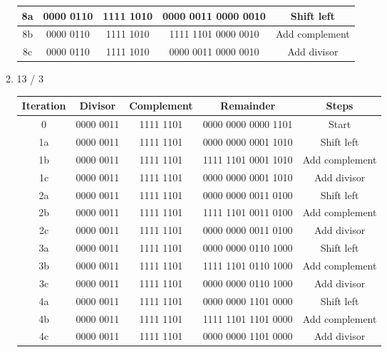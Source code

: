 \documentclass[12pt]{article}
\begin{document}
\begin{enumerate}
\begin{enumerate}
\begin{center}
\begin{tabular}{|c|c|c|c|c|}
        8a & 0000 0110 & 1111 1010 & 0000 0011 0000 0010 & Shift left \\
        \hline
        8b & 0000 0110 & 1111 1010 & 1111 1101 0000 0010 & Add complement \\
        \hline
        8c & 0000 0110 & 1111 1010 & 0000 0011 0000 0010 & Add divisor \\
        \hline
      \end{tabular}
      \end{center}

      \item 13 / 3
      \begin{center}
      \begin{tabular}{|c|c|c|c|c|} 
        \hline
        \textbf{Iteration} & \textbf{Divisor} & \textbf{Complement} & \textbf{Remainder} & \textbf{Steps} \\ 
        \hline
        0 & 0000 0011 & 1111 1101 & 0000 0000 0000 1101 & Start \\
        \hline

        1a & 0000 0011 & 1111 1101 & 0000 0000 0001 1010 & Shift left \\
        \hline
        1b & 0000 0011 & 1111 1101 & 1111 1101 0001 1010 & Add complement \\
        \hline
        1c & 0000 0011 & 1111 1101 & 0000 0000 0001 1010 & Add divisor \\
        \hline

        2a & 0000 0011 & 1111 1101 & 0000 0000 0011 0100 & Shift left \\
        \hline
        2b & 0000 0011 & 1111 1101 & 1111 1101 0011 0100 & Add complement \\
        \hline
        2c & 0000 0011 & 1111 1101 & 0000 0000 0011 0100 & Add divisor \\
        \hline

        3a & 0000 0011 & 1111 1101 & 0000 0000 0110 1000 & Shift left \\
        \hline
        3b & 0000 0011 & 1111 1101 & 1111 1101 0110 1000 & Add complement \\
        \hline
        3c & 0000 0011 & 1111 1101 & 0000 0000 0110 1000 & Add divisor \\
        \hline

        4a & 0000 0011 & 1111 1101 & 0000 0000 1101 0000 & Shift left \\
        \hline
        4b & 0000 0011 & 1111 1101 & 1111 1101 1101 0000 & Add complement \\
        \hline
        4c & 0000 0011 & 1111 1101 & 0000 0000 1101 0000 & Add divisor \\
        \hline


\end{tabular}
\end{center}
\end{enumerate}
\end{enumerate}
\end{document}
